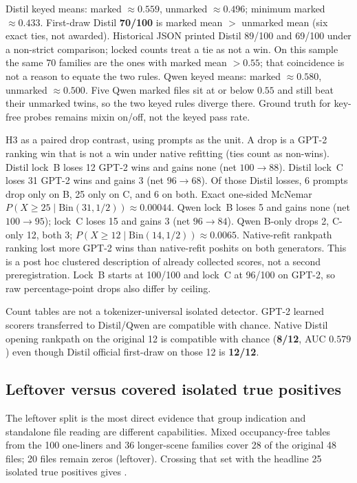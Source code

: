 \documentclass[11pt,a4paper]{article}
\theoremstyle{definition}
\begin{document}
Distil keyed means: marked $\approx 0.559$, unmarked $\approx 0.496$;
minimum marked $\approx 0.433$. First-draw Distil \textbf{70/100} is
marked mean $>$ unmarked mean (six exact ties, not awarded).
Historical JSON printed Distil 89/100 and 69/100 under a non-strict
comparison; locked counts treat a tie as not a win. On this
sample the same 70 families are the ones with marked mean $>0.55$; that
coincidence is not a reason to equate the two rules. Qwen keyed means:
marked $\approx 0.580$, unmarked $\approx 0.500$. Five Qwen marked files
sit at or below $0.55$ and still beat their unmarked twins, so the two
keyed rules diverge there. Ground truth for key-free probes remains
mixin on/off, not the keyed pass rate.

H3 as a paired drop contrast, using prompts as the unit. A drop is a
GPT-2 ranking win that is not a win under native refitting (ties count
as non-wins). Distil lock~B loses 12 GPT-2 wins and gains none (net
$100\to 88$). Distil lock~C loses 31 GPT-2 wins and gains 3 (net
$96\to 68$). Of those Distil losses, 6 prompts drop only on B, 25 only
on C, and 6 on both. Exact one-sided McNemar
$P(X\ge 25\mid \mathrm{Bin}(31,1/2))\approx 0.00044$.
Qwen lock~B loses 5 and gains none (net $100\to 95$); lock~C loses 15
and gains 3 (net $96\to 84$). Qwen B-only drops 2, C-only 12, both 3;
$P(X\ge 12\mid \mathrm{Bin}(14,1/2))\approx 0.0065$. Native-refit rankpath ranking lost more GPT-2 wins than native-refit
poshits on both generators. This is a post hoc
clustered description of already collected scores, not a second
preregistration.
Lock~B starts at 100/100 and lock~C at 96/100 on GPT-2, so raw
percentage-point drops also differ by ceiling.

Count tables are not a tokenizer-universal isolated detector. GPT-2
learned scorers transferred to Distil/Qwen are compatible with chance.
Native Distil
opening rankpath on the original 12 is compatible with chance
(\textbf{8/12}, AUC $0.579$) even though Distil official first-draw on
those 12 is \textbf{12/12}.

\subsection{Leftover versus covered isolated true positives}
\label{sec:leftover}

The leftover split is the most direct evidence that group indication and
standalone file reading are different capabilities. Mixed occupancy-free
tables from the 100 one-liners and 36 longer-scene families cover 28 of
the original 48 files; 20 files remain zeros (leftover). Crossing that
set with the headline 25 isolated true positives gives .
\end{document}
